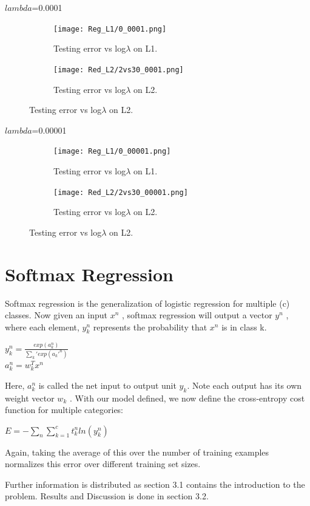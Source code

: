 \documentclass{article} %
\begin{document}
$lambda$=0.0001

\begin{figure}[H]
\centering
\begin{subfigure}{.5\textwidth}
	\centering
	\texttt{[image: Reg\_L1/0\_0001.png]}
	\caption{Testing error vs log$\lambda$ on L1.}
\end{subfigure}%
\begin{subfigure}{.5\textwidth}
	\centering
	\texttt{[image: Red\_L2/2vs30\_0001.png]}
	\caption{Testing error vs log$\lambda$ on L2.}
\end{subfigure}
\end{figure}

$lambda$=0.00001
\begin{figure}[H]
\centering
\begin{subfigure}{.5\textwidth}
	\centering
	\texttt{[image: Reg\_L1/0\_00001.png]}
	\caption{Testing error vs log$\lambda$ on L1.}
\end{subfigure}%
\begin{subfigure}{.5\textwidth}
	\centering
	\texttt{[image: Red\_L2/2vs30\_00001.png]}
	\caption{Testing error vs log$\lambda$ on L2.}
\end{subfigure}
\end{figure}


\section{Softmax Regression}
Softmax regression is the generalization of logistic regression for multiple (c) classes. Now given an input $x^n$ , softmax regression will output a vector $y^n$ , where each element, $y_k^n$ represents the probability that $x^n$ is in class k.
\begin{center}
$y_k^n = \frac{exp(a_{k}^n)}{\sum_k' exp(a_k'^n)}$\\
$a_{k}^n = w_k^T x^n$
\end{center}

Here, $a_{k}^n$ is called the net input to output unit $y_k$. Note each output has its own weight vector $w_k$ . With our model defined, we now define the cross-entropy cost function for multiple categories:
\begin{center}
$E = −\sum_n \sum_{k=1}^{c} t^n_k ln(y_k^n)$
\end{center}

Again, taking the average of this over the number of training examples normalizes this error over different training set sizes.

Further information is distributed as section 3.1 contains the introduction to the problem. Results and Discussion is done in section 3.2.
\end{document}
